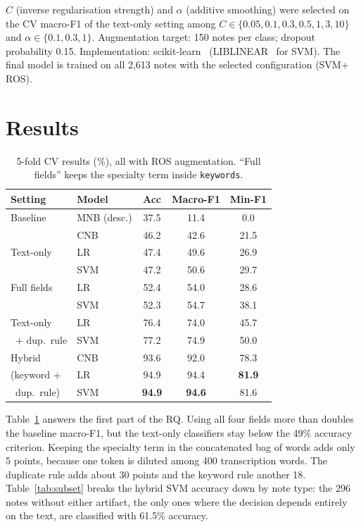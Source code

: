 \documentclass[twocolumn,10pt]{article}
\newcommand{\cv}{CV\xspace}
\newcommand{\svm}{SVM\xspace}
\newcommand{\lr}{LR\xspace}
\newcommand{\cnb}{CNB\xspace}
\newcommand{\ros}{ROS\xspace}
\begin{document}
$C$ (inverse regularisation strength) and $\alpha$ (additive smoothing) were selected on the \cv macro-F1 of the text-only setting among $C\in\{0.05,0.1,0.3,0.5,1,3,10\}$ and $\alpha\in\{0.1,0.3,1\}$. Augmentation target: 150 notes per class; dropout probability 0.15. Implementation: scikit-learn~\cite{sklearn} (LIBLINEAR~\cite{fan2008liblinear} for \svm). The final model is trained on all 2,613 notes with the selected configuration (\svm + \ros).

\section{Results}

\begin{table}[t]
\centering\small
\setlength{\tabcolsep}{4pt}
\begin{tabular}{llccc}
\toprule
Setting & Model & Acc & Macro-F1 & Min-F1 \\
\midrule
Baseline & MNB (desc.) & 37.5 & 11.4 & 0.0 \\
\midrule
\multirow{3}{*}{Text-only}
 & \cnb & 46.2 & 42.6 & 21.5 \\
 & \lr  & 47.4 & 49.6 & 26.9 \\
 & \svm & 47.2 & 50.6 & 29.7 \\
\midrule
Full fields & \lr & 52.4 & 54.0 & 28.6 \\
            & \svm & 52.3 & 54.7 & 38.1 \\
\midrule
Text-only & \lr  & 76.4 & 74.0 & 45.7 \\
\ + dup.\ rule & \svm & 77.2 & 74.9 & 50.0 \\
\midrule
Hybrid & \cnb & 93.6 & 92.0 & 78.3 \\
(keyword +  & \lr & 94.9 & 94.4 & \textbf{81.9} \\
\ dup.\ rule) & \svm & \textbf{94.9} & \textbf{94.6} & 81.6 \\
\bottomrule
\end{tabular}
\caption{5-fold \cv results (\%), all with \ros augmentation. ``Full fields'' keeps the specialty term inside \texttt{keywords}.}
\label{tab:main}
\end{table}

Table~\ref{tab:main} answers the first part of the RQ. Using all four fields more than doubles the baseline macro-F1, but the text-only classifiers stay below the 49\% accuracy criterion. Keeping the specialty term in the concatenated bag of words adds only 5 points, because one token is diluted among 400 transcription words. The duplicate rule adds about 30 points and the keyword rule another 18. Table~\ref{tab:subset} breaks the hybrid \svm accuracy down by note type: the 296 notes without either artifact, the only ones where the decision depends entirely on the text, are classified with 61.5\% accuracy.
\end{document}

